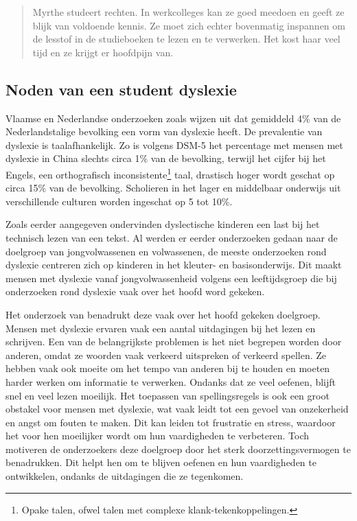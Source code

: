 \begin{quote}
	Myrthe studeert rechten. In werkcolleges kan ze goed meedoen en geeft ze blijk van voldoende kennis. Ze moet zich echter bovenmatig inspannen om de lesstof in de studieboeken te lezen en te verwerken. Het kost haar veel tijd en ze krijgt er hoofdpijn van.
\end{quote}

\subsection{Noden van een student dyslexie}

Vlaamse en Nederlandse onderzoeken zoals \textcite{Wentink2008, Desoete2017} wijzen uit dat gemiddeld 4\% van de Nederlandstalige bevolking een vorm van dyslexie heeft. De prevalentie van dyslexie is taalafhankelijk. Zo is volgens DSM-5 het percentage met mensen met dyslexie in China slechts circa 1\% van de bevolking, terwijl het cijfer bij het Engels, een orthografisch inconsistente\footnote{Opake talen, ofwel talen met complexe klank-tekenkoppelingen.} taal, drastisch hoger wordt geschat op circa 15\% van de bevolking. Scholieren in het lager en middelbaar onderwijs uit verschillende culturen worden ingeschat op 5 tot 10\%. \autocite{}

Zoals eerder aangegeven ondervinden dyslectische kinderen een last bij het technisch lezen van een tekst. Al werden er eerder onderzoeken gedaan naar de doelgroep van jongvolwassenen en volwassenen, de meeste onderzoeken rond dyslexie centreren zich op kinderen in het kleuter- en basisonderwijs. Dit maakt mensen met dyslexie vanaf jongvolwassenheid volgens \textcite{Lissens2020} een leeftijdsgroep die bij onderzoeken rond dyslexie vaak over het hoofd word gekeken.

Het onderzoek van \textcite{Lissens2020} benadrukt deze vaak over het hoofd gekeken doelgroep. Mensen met dyslexie ervaren vaak een aantal uitdagingen bij het lezen en schrijven. Een van de belangrijkste problemen is het niet begrepen worden door anderen, omdat ze woorden vaak verkeerd uitspreken of verkeerd spellen. Ze hebben vaak ook moeite om het tempo van anderen bij te houden en moeten harder werken om informatie te verwerken. Ondanks dat ze veel oefenen, blijft snel en veel lezen moeilijk. Het toepassen van spellingsregels is ook een groot obstakel voor mensen met dyslexie, wat vaak leidt tot een gevoel van onzekerheid en angst om fouten te maken. Dit kan leiden tot frustratie en stress, waardoor het voor hen moeilijker wordt om hun vaardigheden te verbeteren. Toch motiveren de onderzoekers deze doelgroep door het sterk doorzettingsvermogen te benadrukken. Dit helpt hen om te blijven oefenen en hun vaardigheden te ontwikkelen, ondanks de uitdagingen die ze tegenkomen.

